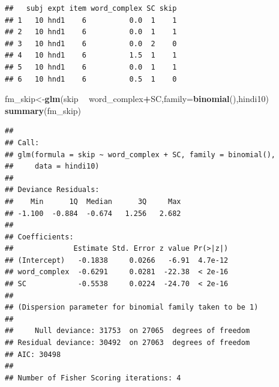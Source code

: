 \documentclass[12pt,]{krantz}
\newenvironment{Shaded}{\begin{snugshade}}{\end{snugshade}}
\newcommand{\CommentTok}[1]{\textcolor[rgb]{0.56,0.35,0.01}{\textit{#1}}}
\newcommand{\DataTypeTok}[1]{\textcolor[rgb]{0.13,0.29,0.53}{#1}}
\newcommand{\DecValTok}[1]{\textcolor[rgb]{0.00,0.00,0.81}{#1}}
\newcommand{\KeywordTok}[1]{\textcolor[rgb]{0.13,0.29,0.53}{\textbf{#1}}}
\newcommand{\NormalTok}[1]{#1}
\newcommand{\OperatorTok}[1]{\textcolor[rgb]{0.81,0.36,0.00}{\textbf{#1}}}
\newcommand{\OtherTok}[1]{\textcolor[rgb]{0.56,0.35,0.01}{#1}}
\newcommand{\StringTok}[1]{\textcolor[rgb]{0.31,0.60,0.02}{#1}}
\begin{document}
\begin{Shaded}
\end{Shaded}

\begin{verbatim}
##   subj expt item word_complex SC skip
## 1   10 hnd1    6          0.0  1    1
## 2   10 hnd1    6          0.0  1    1
## 3   10 hnd1    6          0.0  2    0
## 4   10 hnd1    6          1.5  1    1
## 5   10 hnd1    6          0.0  1    1
## 6   10 hnd1    6          0.5  1    0
\end{verbatim}

\begin{Shaded}
\begin{Highlighting}[]
\NormalTok{fm_skip<-}\KeywordTok{glm}\NormalTok{(skip }\OperatorTok{~}\StringTok{ }\NormalTok{word_complex}\OperatorTok{+}\NormalTok{SC,}\DataTypeTok{family=}\KeywordTok{binomial}\NormalTok{(),hindi10)}
\KeywordTok{summary}\NormalTok{(fm_skip)}
\end{Highlighting}
\end{Shaded}

\begin{verbatim}
## 
## Call:
## glm(formula = skip ~ word_complex + SC, family = binomial(), 
##     data = hindi10)
## 
## Deviance Residuals: 
##    Min      1Q  Median      3Q     Max  
## -1.100  -0.884  -0.674   1.256   2.682  
## 
## Coefficients:
##              Estimate Std. Error z value Pr(>|z|)
## (Intercept)   -0.1838     0.0266   -6.91  4.7e-12
## word_complex  -0.6291     0.0281  -22.38  < 2e-16
## SC            -0.5538     0.0224  -24.70  < 2e-16
## 
## (Dispersion parameter for binomial family taken to be 1)
## 
##     Null deviance: 31753  on 27065  degrees of freedom
## Residual deviance: 30492  on 27063  degrees of freedom
## AIC: 30498
## 
## Number of Fisher Scoring iterations: 4
\end{verbatim}
\end{document}
